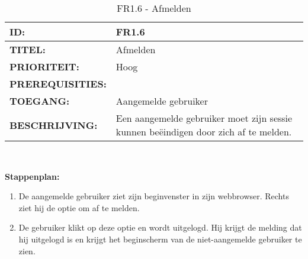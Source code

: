 
\noindent\begin{table}[H]
            \begin{tabular}{l | p{10cm}}
                \textbf{ID:} & FR1.6 \\ \hline
                \textbf{TITEL:} & Afmelden\\ \hline
                \textbf{PRIORITEIT:} &  Hoog \\ \hline
                \textbf{PREREQUISITIES:} & \\ \hline
                \textbf{TOEGANG:} &  Aangemelde gebruiker \\ \hline
                \textbf{BESCHRIJVING:} & Een aangemelde gebruiker moet zijn sessie kunnen be\"{e}indigen door zich af te melden.\\
            \end{tabular}\\
            \caption{FR1.6 - Afmelden}
            \label{tab:FR1.6 - Afmelden}
        \end{table}
\textbf{Stappenplan:}
\begin{enumerate}
\item De aangemelde gebruiker ziet zijn beginvenster in zijn webbrowser. Rechts ziet hij de optie om af te melden.
\item De gebruiker klikt op deze optie en wordt uitgelogd. Hij krijgt de melding dat hij uitgelogd is en krijgt het beginscherm van de niet-aangemelde gebruiker te zien.
\end{enumerate}
 

